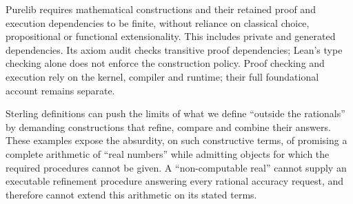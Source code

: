 \documentclass[11pt]{article}
\begin{document}
\begin{samepage}
Purelib requires mathematical constructions and their retained proof and
execution dependencies to be finite, without reliance on classical choice,
propositional or functional extensionality. This includes private and
generated dependencies. Its axiom audit checks
transitive proof dependencies; Lean's type checking alone does not enforce
the construction policy. Proof checking and execution rely on the kernel,
compiler and runtime; their full foundational account remains separate.
\par\end{samepage}

Sterling definitions can push the limits of what we define ``outside the
rationals'' by demanding constructions that refine, compare and combine
their answers. These examples expose the absurdity, on such constructive
terms, of promising a complete arithmetic of ``real numbers'' while admitting
objects for which the required procedures cannot be given. A
``non-computable real'' cannot supply an executable refinement procedure
answering every rational accuracy request, and therefore cannot extend
this arithmetic on its stated terms.
\end{document}
